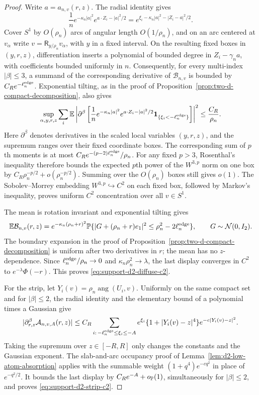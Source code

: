 \begin{proof}
Write \(a=a_{n,v}(r,z)\). The radial identity gives
\[
 \frac1n e^{-\kappa_n|a|^2}e^{a\cdot Z_i-|a|^2/2}
 =e^{\xi_i-\kappa_n|a|^2-|Z_i-a|^2/2}.
\]
Cover \(S^1\) by \(O(\rho_n)\) arcs of angular length \(O(1/\rho_n)\), and on
an arc centered at \(v_\alpha\) write
\(v=\mathsf R_{y/\rho_n}v_\alpha\), with \(y\) in a fixed interval. On the
resulting fixed boxes in \((y,r,z)\), differentiation inserts a polynomial of
bounded degree in \(Z_i-\gamma_na\), with coefficients bounded uniformly in
\(n\). Consequently, for every multi-index \(|\beta|\le3\), a summand of the
corresponding derivative of \(\mathcal B_{n,v}\) is bounded by
\(C_Re^{-\ell_n^{\rm edge}}\). Exponential tilting, as in the proof of
Proposition~\ref{prop:two-d-compact-decomposition}, also gives
\[
 \sup_{\alpha,y,r,z}\sum_i
 \mathbb E\left|\partial^\beta
   \left[\frac1n e^{-\kappa_n|a|^2}
   e^{a\cdot Z_i-|a|^2/2}
   \mathbf1_{\{\xi_i<-\ell_n^{\rm edge}\}}\right]\right|^2
 \le \frac{C_R}{\rho_n}.
\]
Here \(\partial^\beta\) denotes derivatives in the scaled local variables
\((y,r,z)\), and the supremum ranges over their fixed coordinate boxes.
The corresponding sum of \(p\)th moments is at most
\(C_Re^{-(p-2)\ell_n^{\rm edge}}/\rho_n\). For any fixed \(p>3\),
Rosenthal's inequality therefore bounds the expected \(p\)th power of the
\(W^{3,p}\) norm on one box by
\(C_R\rho_n^{-p/2}+o(\rho_n^{-p/2})\). Summing over the
\(O(\rho_n)\) boxes still gives \(o(1)\). The Sobolev--Morrey embedding
\(W^{3,p}\hookrightarrow C^2\) on each fixed box, followed by Markov's
inequality, proves uniform \(C^2\) concentration over all \(v\in S^1\).

The mean is rotation invariant and exponential tilting gives
\[
 \mathbb E\mathcal B_{n,v}(r,z)
 =e^{-\kappa_n(\rho_n+r)^2}
   \mathbb P\{|G+(\rho_n+r)e_1|^2
              \le\rho_n^2-2\ell_n^{\rm edge}\},
 \qquad G\sim\mathcal N(0,I_2).
\]
The boundary expansion in the proof of
Proposition~\ref{prop:two-d-compact-decomposition} is uniform after two
derivatives in \(r\); the mean has no \(z\)-dependence. Since
\(\ell_n^{\rm edge}/\rho_n\to0\) and
\(\kappa_n\rho_n^2\to\lambda\), the last display converges in \(C^2\) to
\(e^{-\lambda}\Phi(-r)\). This proves
\eqref{eq:support-d2-diffuse-c2}.

For the strip, let \(Y_i(v)=\rho_n\operatorname{ang}(U_i,v)\). Uniformly on
the same compact set and for \(|\beta|\le2\), the radial identity and the
elementary bound of a polynomial times a Gaussian give
\[
 |\partial_{r,z}^\beta \mathcal A_{n,v,A}(r,z)|
 \le C_R\sum_{i:\,-\ell_n^{\rm edge}\le\xi_i\le-A}
 e^{\xi_i}\{1+|Y_i(v)-z|^4\}e^{-c|Y_i(v)-z|^2}.
\]
Taking the supremum over \(z\in[-R,R]\) only changes the constants and the
Gaussian exponent. The slab-and-arc occupancy proof of
Lemma~\ref{lem:d2-low-atom-absorption} applies with the summable weight
\((1+q^4)e^{-cq^2}\) in place of \(e^{-q^2/2}\). It bounds the last display
by \(C_Re^{-A}+o_{\mathbb P}(1)\), simultaneously for \(|\beta|\le2\), and proves
\eqref{eq:support-d2-strip-c2}.
\end{proof}

